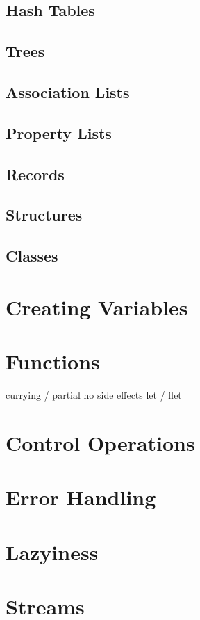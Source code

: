 \documentclass[11pt]{article}
\begin{document}
\subsection{Hash Tables}
\label{sec-5-3}
\subsection{Trees}
\label{sec-5-4}
\subsection{Association Lists}
\label{sec-5-5}
\subsection{Property Lists}
\label{sec-5-6}
\subsection{Records}
\label{sec-5-7}
\subsection{Structures}
\label{sec-5-8}
\subsection{Classes}
\label{sec-5-9}
\section{Creating Variables}
\label{sec-6}
\section{Functions}
\label{sec-7}
currying / partial
no side effects
let / flet 
\section{Control Operations}
\label{sec-8}
\section{Error Handling}
\label{sec-9}
\section{Lazyiness}
\label{sec-10}
\section{Streams}
\label{sec-11}
\end{document}
